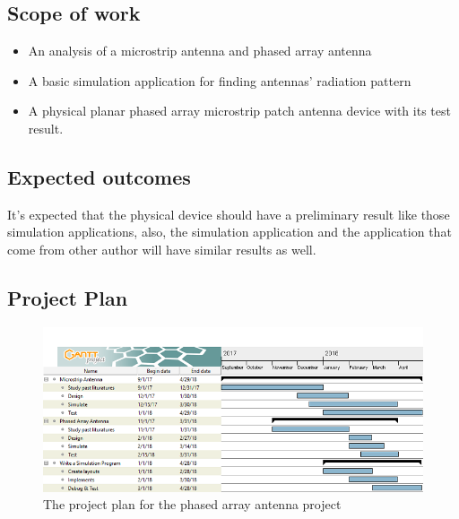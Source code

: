 \documentclass[11pt,a4paper,hidelinks]{article}
\begin{document}
    \subsection{Scope of work}
      \begin{itemize}
        \item An analysis of a microstrip antenna and phased array antenna
        \item A basic simulation application for finding antennas' radiation pattern
        \item A physical planar phased array microstrip patch antenna device with its test result.
      \end{itemize}

    \subsection{Expected outcomes}
      \indent It's expected that the physical device should have a preliminary result like those simulation
      applications, also, the simulation application and the application that come from other author
      will have similar results as well.
      
       
  
  \newpage
    \begin{landscape}  
    \subsection{Project Plan}
      \begin{figure}[ht]
        \includegraphics{gantt.png}
        \centering
        \caption{The project plan for the phased array antenna project}
      \end{figure}
    \end{landscape}
  
  \newpage

   
  
\end{document}
